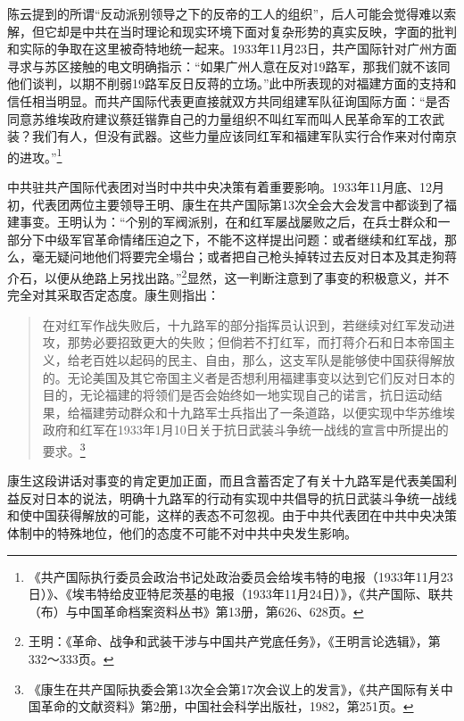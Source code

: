 陈云提到的所谓“反动派别领导之下的反帝的工人的组织”，后人可能会觉得难以索解，但它却是中共在当时理论和现实环境下面对复杂形势的真实反映，字面的批判和实际的争取在这里被奇特地统一起来。1933年11月23日，共产国际针对广州方面寻求与苏区接触的电文明确指示：“如果广州人意在反对19路军，那我们就不该同他们谈判，以期不削弱19路军反日反蒋的立场。”此中所表现的对福建方面的支持和信任相当明显。而共产国际代表更直接就双方共同组建军队征询国际方面：“是否同意苏维埃政府建议蔡廷锴靠自己的力量组织不叫红军而叫人民革命军的工农武装？我们有人，但没有武器。这些力量应该同红军和福建军队实行合作来对付南京的进攻。”\footnote{《共产国际执行委员会政治书记处政治委员会给埃韦特的电报（1933年11月23日）》、《埃韦特给皮亚特尼茨基的电报（1933年11月24日）》，《共产国际、联共（布）与中国革命档案资料丛书》第13册，第626、628页。}


中共驻共产国际代表团对当时中共中央决策有着重要影响。1933年11月底、12月初，代表团两位主要领导王明、康生在共产国际第13次全会大会发言中都谈到了福建事变。王明认为：“个别的军阀派别，在和红军屡战屡败之后，在兵士群众和一部分下中级军官革命情绪压迫之下，不能不这样提出问题：或者继续和红军战，那么，毫无疑问地他们将要完全塌台；或者把自己枪头掉转过去反对日本及其走狗蒋介石，以便从绝路上另找出路。”\footnote{王明：《革命、战争和武装干涉与中国共产党底任务》，《王明言论选辑》，第332～333页。}显然，这一判断注意到了事变的积极意义，并不完全对其采取否定态度。康生则指出：

\begin{quote}

在对红军作战失败后，十九路军的部分指挥员认识到，若继续对红军发动进攻，那势必要招致更大的失败；但倘若不打红军，而打蒋介石和日本帝国主义，给老百姓以起码的民主、自由，那么，这支军队是能够使中国获得解放的。无论美国及其它帝国主义者是否想利用福建事变以达到它们反对日本的目的，无论福建的将领们是否会始终如一地实现自己的诺言，抗日运动结果，给福建劳动群众和十九路军士兵指出了一条道路，以便实现中华苏维埃政府和红军在1933年1月10日关于抗日武装斗争统一战线的宣言中所提出的要求。\footnote{《康生在共产国际执委会第13次全会第17次会议上的发言》，《共产国际有关中国革命的文献资料》第2册，中国社会科学出版社，1982，第251页。}
\end{quote}


康生这段讲话对事变的肯定更加正面，而且含蓄否定了有关十九路军是代表美国利益反对日本的说法，明确十九路军的行动有实现中共倡导的抗日武装斗争统一战线和使中国获得解放的可能，这样的表态不可忽视。由于中共代表团在中共中央决策体制中的特殊地位，他们的态度不可能不对中共中央发生影响。


